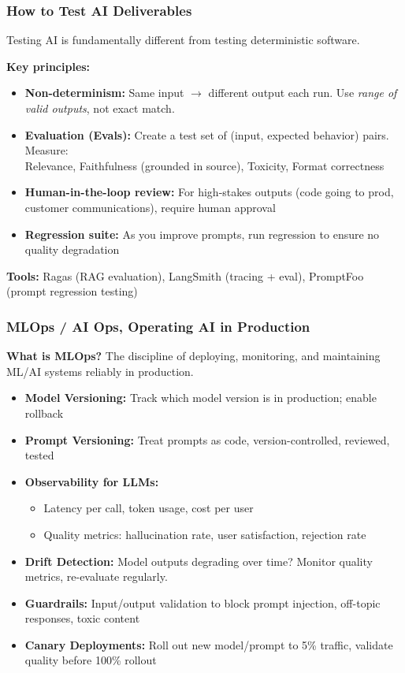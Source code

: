 \begin{frame}[fragile]\frametitle{How to Test AI Deliverables}
Testing AI is fundamentally different from testing deterministic software.

\textbf{Key principles:}
\begin{itemize}
\item \textbf{Non-determinism:} Same input $\rightarrow$ different output each run. Use \textit{range of valid outputs}, not exact match.
\item \textbf{Evaluation (Evals):} Create a test set of (input, expected behavior) pairs. Measure:\\
  Relevance, Faithfulness (grounded in source), Toxicity, Format correctness
\item \textbf{Human-in-the-loop review:} For high-stakes outputs (code going to prod, customer communications), require human approval
\item \textbf{Regression suite:} As you improve prompts, run regression to ensure no quality degradation
\end{itemize}

\textbf{Tools:} Ragas (RAG evaluation), LangSmith (tracing + eval), PromptFoo (prompt regression testing)
\end{frame}

\begin{frame}[fragile]\frametitle{MLOps / AI Ops, Operating AI in Production}
\textbf{What is MLOps?} The discipline of deploying, monitoring, and maintaining ML/AI systems reliably in production.

\begin{itemize}
\item \textbf{Model Versioning:} Track which model version is in production; enable rollback
\item \textbf{Prompt Versioning:} Treat prompts as code, version-controlled, reviewed, tested
\item \textbf{Observability for LLMs:}
  \begin{itemize}
  \item Latency per call, token usage, cost per user
  \item Quality metrics: hallucination rate, user satisfaction, rejection rate
  \end{itemize}
\item \textbf{Drift Detection:} Model outputs degrading over time? Monitor quality metrics, re-evaluate regularly.
\item \textbf{Guardrails:} Input/output validation to block prompt injection, off-topic responses, toxic content
\item \textbf{Canary Deployments:} Roll out new model/prompt to 5\% traffic, validate quality before 100\% rollout
\end{itemize}
\end{frame}

